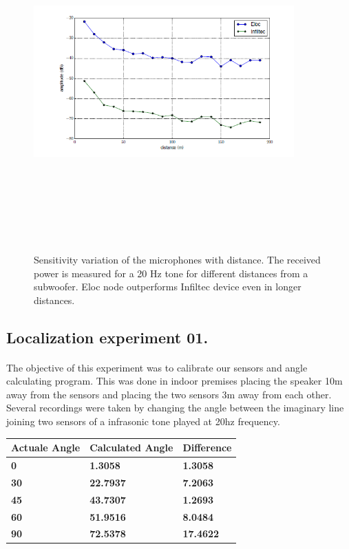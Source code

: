 \documentclass[12pt]{article}
\numberwithin{figure}{section}
\numberwithin{table}{section}
\begin{document}
\begin{figure}[H]
\centering
\includegraphics[width=10cm,height=13cm,keepaspectratio]{eloc_vs_infiltec2.png}
\caption{Sensitivity variation of the microphones with distance.
The received power is measured for a 20 Hz tone
for different distances from a subwoofer. Eloc node outperforms
Infiltec device even in longer distances.}
\label{infiltec:eloc2}
\end{figure}

\subsection{Localization experiment 01.}
\paragraph{}
The objective of this experiment was to calibrate our sensors and angle calculating program. This was done in indoor premises placing the speaker 10m away from the sensors and placing the two sensors 3m away from each other. Several recordings were taken by changing the angle between the imaginary line joining two sensors of a infrasonic tone played at 20hz frequency. 

\begin{table}[H]
\centering
\begin{tabular}{|m{}|m{}|m{}|} 
\hline
\bf {Actuale Angle} &  {\bf{ Calculated Angle }} & {\bf{ Difference }}\\
\hline
\hline
\bf {0} &  {\bf{ 1.3058 }} & {\bf{ 1.3058 }}\\
\hline
\bf {30} &  {\bf{ 22.7937 }} & {\bf{ 7.2063 }}\\
\hline
\bf {45} &  {\bf{ 43.7307 }} & {\bf{ 1.2693 }}\\
\hline
\bf {60} &  {\bf{ 51.9516 }} & {\bf{ 8.0484 }}\\
\hline
\bf {90} &  {\bf{ 72.5378 }} & {\bf{ 17.4622 }}\\
\hline
\end{tabular}
\end{table}
\end{document}
